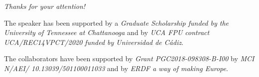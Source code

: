 \begin{frame}{}
	\centering
	\vspace*{1cm}
	{\Huge
		\emph{Thanks for your attention!}}
	
	\vspace*{1cm}
	\begin{acknowledgements}
		The speaker has been supported by a \textit{Graduate Scholarship funded by the University of Tennessee at Chattanooga} and by \textit{UCA FPU contract UCA/REC14VPCT/2020 funded by Universidad de Cádiz}.
		
		The collaborators have been supported by \textit{Grant PGC2018-098308-B-I00} by \textit{MCI N/AEI/ 10.13039/501100011033} and by \textit{ERDF a way of making Europe}.
	\end{acknowledgements}
\end{frame}